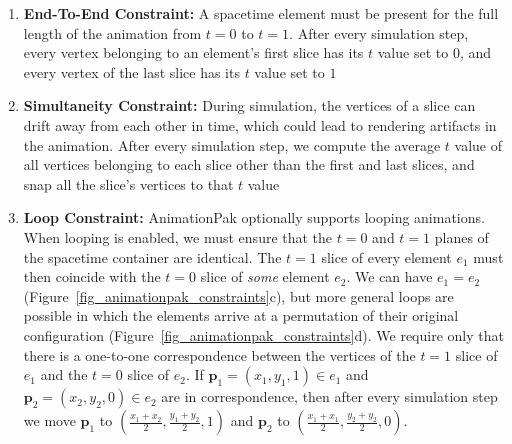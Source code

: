 

\begin{enumerate}
\item \textbf{End-To-End Constraint:}
A spacetime element must be present for the full length of the animation
from $t=0$ to $t=1$.  After every simulation step, every vertex belonging
to an element's first slice has its $t$ value set to $0$, and every vertex
of the last slice has its $t$ value set to $1$

\item \textbf{Simultaneity Constraint:}
During simulation, the vertices of a slice can drift away from each
other in time, which could lead to rendering artifacts in the animation.
After every simulation step, we compute the average $t$ value of all
vertices belonging to each slice other than the first and last slices, and 
snap all the slice's vertices to that $t$ value 


\item \textbf{Loop Constraint:}
AnimationPak optionally supports looping animations.
When looping is enabled, we must ensure that the $t=0$ and $t=1$ planes
of the spacetime container are identical.  
The $t=1$ slice of every element $e_1$ must then 
coincide with the $t=0$ slice of \textit{some} 
element $e_2$.  We can have $e_1=e_2$ 
(Figure~\ref{fig_animationpak_constraints}c), but more general loops are possible in which
the elements arrive at a permutation of their original configuration
(Figure~\ref{fig_animationpak_constraints}d).  We require only that there is a one-to-one
correspondence between the vertices of the $t=1$ slice of $e_1$ and the
$t=0$ slice of $e_2$.  If $\bm{p}_1=(x_1,y_1,1)\in e_1$ and
$\bm{p}_2=(x_2,y_2,0)\in e_2$
are in correspondence, then after every simulation step we
move $\bm{p}_1$ to $(\frac{x_1+x_2}{2},\frac{y_1+y_2}{2},1)$ and
$\bm{p}_2$ to $(\frac{x_1+x_1}{2},\frac{y_2+y_2}{2},0)$.
\end{enumerate}


